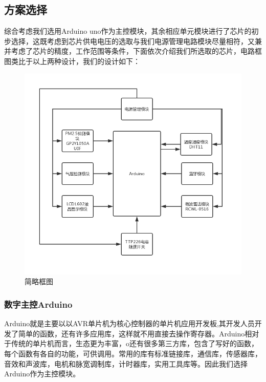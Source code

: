 \documentclass[a4paper, 11pt]{article} %
\begin{document}
\subsection{方案选择}

\label{sec:yuxi}
\par{} 综合考虑我们选用Arduino uno作为主控模块，其余相应单元模块进行了芯片的初步选择，这既考虑到芯片供电电压的选取与我们电源管理电路模块尽量相符，又兼并考虑了芯片的精度，工作范围等条件，下面依次介绍我们所选取的芯片，电路框图类比于以上两种设计，我们的设计如下：
\begin{figure}[H]
  \centering
  \includegraphics[scale = 0.45]{1-n.png}
  \caption{简略框图}
  \label{img6} 
\end{figure}
\subsubsection{数字主控Arduino}
\par{} Arduino就是主要以以AVR单片机为核心控制器的单片机应用开发板,其开发人员开发了简单的函数，还有许多应用库，这样就不用直接去操作寄存器。Arduino相对于传统的单片机而言，生态更为丰富，o还有很多第三方库，包含了写好的函数，每个函数有各自的功能，可供调用。常用的库有标准链接库，通信库，传感器库，音效和声波库，电机和脉宽调制库，计时器库，实用工具库等。因此我们选择Arduino作为主控模块。
\end{document}
